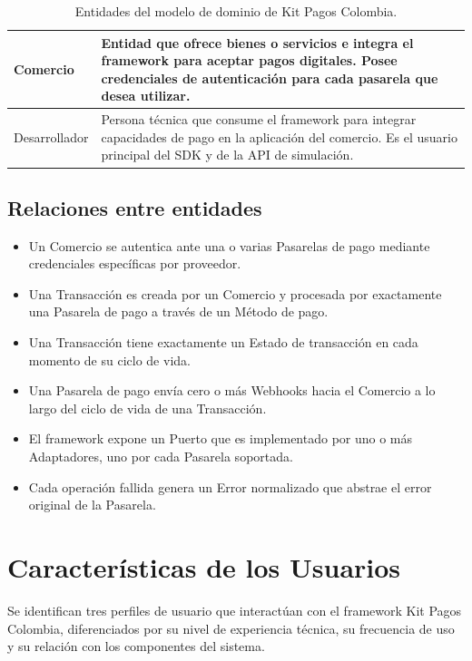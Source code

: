 \documentclass[10pt]{article}
\begin{document}
\begin{table}[htbp]
\begin{tabularx}{\textwidth}{|l|X|}
    \hline
    Comercio & Entidad que ofrece bienes o servicios e integra el framework para aceptar pagos digitales. Posee credenciales de autenticación para cada pasarela que desea utilizar. \\
    \hline
    Desarrollador & Persona técnica que consume el framework para integrar capacidades de pago en la aplicación del comercio. Es el usuario principal del SDK y de la API de simulación. \\
    \hline
  \end{tabularx}
  \caption{Entidades del modelo de dominio de Kit Pagos Colombia.}
  \label{tab:entidades-dominio}
\end{table}

\subsection{Relaciones entre entidades}

\begin{itemize}
  \item Un Comercio se autentica ante una o varias Pasarelas de pago mediante credenciales específicas por proveedor.
  \item Una Transacción es creada por un Comercio y procesada por exactamente una Pasarela de pago a través de un Método de pago.
  \item Una Transacción tiene exactamente un Estado de transacción en cada momento de su ciclo de vida.
  \item Una Pasarela de pago envía cero o más Webhooks hacia el Comercio a lo largo del ciclo de vida de una Transacción.
  \item El framework expone un Puerto que es implementado por uno o más Adaptadores, uno por cada Pasarela soportada.
  \item Cada operación fallida genera un Error normalizado que abstrae el error original de la Pasarela.
\end{itemize}



\section{Características de los Usuarios}

Se identifican tres perfiles de usuario que interactúan con el framework Kit Pagos Colombia, diferenciados por su nivel de experiencia técnica, su frecuencia de uso y su relación con los componentes del sistema.
\end{document}
